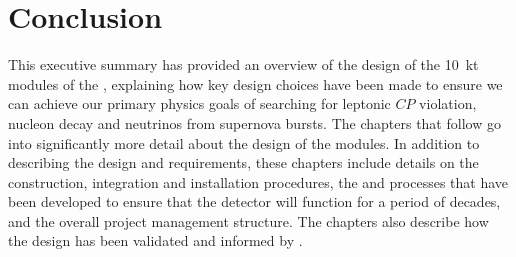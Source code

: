 \section{Conclusion}
\label{sec:fdsp-exec-conclusion}

This executive summary has provided an overview of the design of the \SI{10}{\kilo\tonne}   modules of the  , explaining how key design choices have been made to ensure we can achieve our primary physics goals of searching for leptonic $CP$ violation, nucleon decay and neutrinos from supernova bursts. The chapters that follow go into significantly more detail about the design of the   modules. In addition to describing the design and requirements, these chapters include details on the construction, integration and installation procedures, the  and  processes that have been developed to ensure that the detector will function for a period of decades, and the overall project management structure. The chapters also describe how the design has been validated and informed by .

